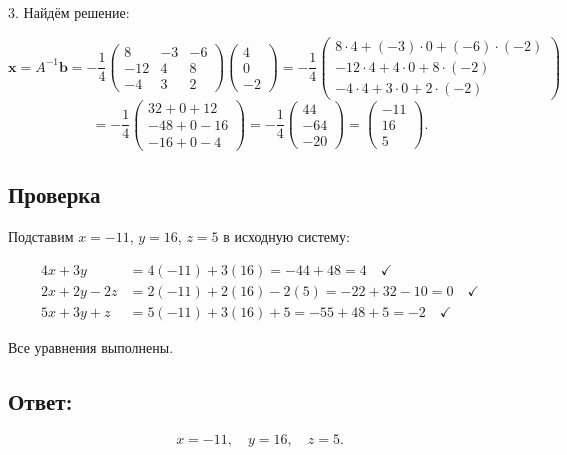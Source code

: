 \documentclass[12pt]{article}
\begin{document}
3. Найдём решение:

\[
\mathbf{x} = A^{-1} \mathbf{b} = -\frac{1}{4}
\begin{pmatrix}
8 & -3 & -6 \\
-12 & 4 & 8 \\
-4 & 3 & 2
\end{pmatrix}
\begin{pmatrix}
4 \\ 0 \\ -2
\end{pmatrix}
= -\frac{1}{4}
\begin{pmatrix}
8 \cdot 4 + (-3) \cdot 0 + (-6) \cdot (-2) \\
-12 \cdot 4 + 4 \cdot 0 + 8 \cdot (-2) \\
-4 \cdot 4 + 3 \cdot 0 + 2 \cdot (-2)
\end{pmatrix}
\]
\[
= -\frac{1}{4}
\begin{pmatrix}
32 + 0 + 12 \\
-48 + 0 - 16 \\
-16 + 0 - 4
\end{pmatrix}
= -\frac{1}{4}
\begin{pmatrix}
44 \\ -64 \\ -20
\end{pmatrix}
=
\begin{pmatrix}
-11 \\ 16 \\ 5
\end{pmatrix}.
\]

\subsection*{Проверка}
Подставим \( x = -11 \), \( y = 16 \), \( z = 5 \) в исходную систему:

\[
\begin{aligned}
4x + 3y &= 4(-11) + 3(16) = -44 + 48 = 4 \quad \checkmark \\
2x + 2y - 2z &= 2(-11) + 2(16) - 2(5) = -22 + 32 - 10 = 0 \quad \checkmark \\
5x + 3y + z &= 5(-11) + 3(16) + 5 = -55 + 48 + 5 = -2 \quad \checkmark
\end{aligned}
\]

Все уравнения выполнены.

\subsection*{Ответ:}
\[
x = -11, \quad y = 16, \quad z = 5.
\]
\end{document}
